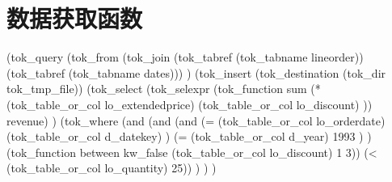 \section*{数据获取函数}\label{A:data}

(tok_query 
    (tok_from (tok_join 
        (tok_tabref (tok_tabname lineorder)) 
        (tok_tabref (tok_tabname dates)))
    ) 
    (tok_insert 
        (tok_destination (tok_dir tok_tmp_file)) 
        (tok_select (tok_selexpr (tok_function sum 
            (* 
                (tok_table_or_col lo_extendedprice) 
                (tok_table_or_col lo_discount)
            )) revenue)
        ) 
        (tok_where (and (and (and 
                (= 
                    (tok_table_or_col lo_orderdate) 
                    (tok_table_or_col d_datekey)
                ) 
                (= (tok_table_or_col d_year) 1993 )
            ) 
            (tok_function between kw_false 
                (tok_table_or_col lo_discount) 1 3)) 
            (< (tok_table_or_col lo_quantity) 25))
        )
    )
)
